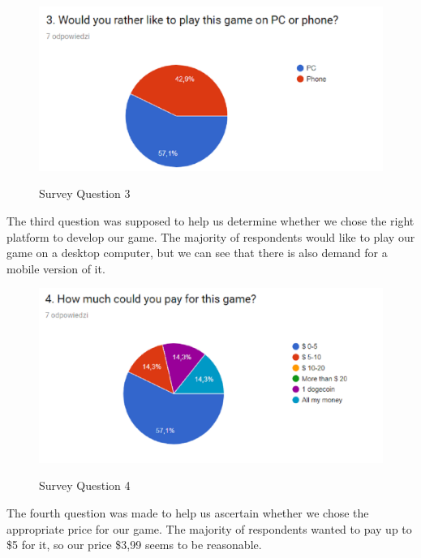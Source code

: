 \documentclass[12p]{article}
\begin{document}
\begin{figure}[ht]
 \center
 \includegraphics[width=1\textwidth]{SurveyQuestions/3.png}
 \label{fig:survey_question_3}
 \caption{Survey Question 3}
\end{figure}

The third question was supposed to help us determine whether we chose the right platform to develop our game. The majority of respondents would like to play our game on a desktop computer, but we can see that there is also demand for a mobile version of it.

\newpage

\begin{figure}[ht]
 \center
 \includegraphics[width=1\textwidth]{SurveyQuestions/4.png}
 \label{fig:survey_question_4}
 \caption{Survey Question 4}
\end{figure}

The fourth question was made to help us ascertain whether we chose the appropriate price for our game. The majority of respondents wanted to pay up to \$5 for it, so our price \$3,99 seems to be reasonable. 

\newpage
\end{document}
